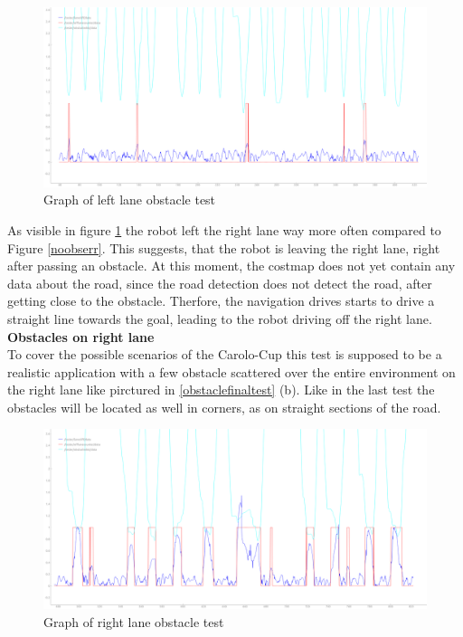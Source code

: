 \begin{figure}[H]
	\includegraphics[width=\textwidth]{Pictures/left obs final obs2}
	\caption{Graph of left lane obstacle test}
	\label{leftobsfinal}
\end{figure}
As visible in figure \ref{leftobsfinal} the robot left the right lane way more often compared to Figure \ref{noobserr}. This suggests, that the robot is leaving the right lane, right after passing an obstacle. At this moment, the costmap does not yet contain any data about the road, since the road detection does not detect the road, after getting close to the obstacle. Therfore, the navigation drives starts to drive a straight line towards the goal, leading to the robot driving off the right lane.\\

\textbf{Obstacles on right lane}\\

To cover the possible scenarios of the Carolo-Cup this test is supposed to be a realistic application with a few obstacle scattered over the entire environment on the right lane like pirctured in \ref{obstaclefinaltest} (b). Like in the last test the obstacles will be located as well in corners, as on straight sections of the road.

\begin{figure}[H]
	\includegraphics[width=\textwidth]{Pictures/right obs final obs}
	\caption{Graph of right lane obstacle test}
	\label{rightobsfinal}
\end{figure}


